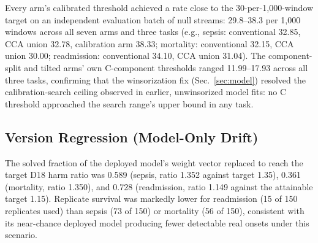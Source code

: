 \documentclass[preprintsapa,article,submit,oneauthor]{Definitions/mdpi}
\begin{document}
Every arm's calibrated threshold achieved a rate close to the 30-per-1{,}000-window target on an independent evaluation batch of null streams: 29.8--38.3 per 1{,}000 windows across all seven arms and three tasks (e.g., sepsis: conventional 32.85, CCA union 32.78, calibration arm 38.33; mortality: conventional 32.15, CCA union 30.00; readmission: conventional 34.10, CCA union 31.04). The component-split and tilted arms' own C-component thresholds ranged 11.99--17.93 across all three tasks, confirming that the winsorization fix (Sec.~\ref{sec:model}) resolved the calibration-search ceiling observed in earlier, unwinsorized model fits: no C threshold approached the search range's upper bound in any task.

\subsection{Version Regression (Model-Only Drift)}\label{sec:results-sc17}

The solved fraction of the deployed model's weight vector replaced to reach the target D18 harm ratio was 0.589 (sepsis, ratio 1.352 against target 1.35), 0.361 (mortality, ratio 1.350), and 0.728 (readmission, ratio 1.149 against the attainable target 1.15). Replicate survival was markedly lower for readmission (15 of 150 replicates used) than sepsis (73 of 150) or mortality (56 of 150), consistent with its near-chance deployed model producing fewer detectable real onsets under this scenario.
\end{document}
